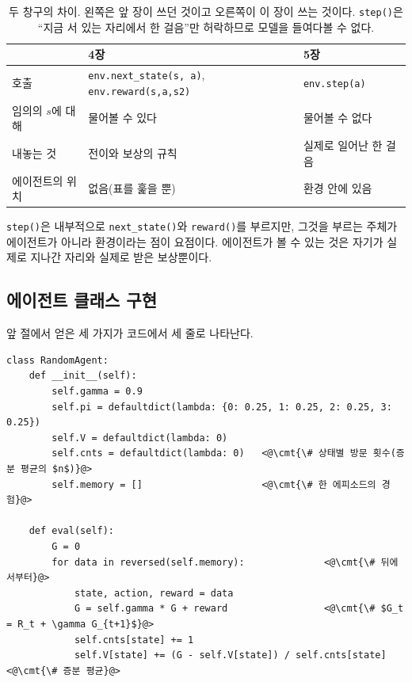 \documentclass[11pt,a4paper]{article}
\newcommand{\cmt}[1]{\textcolor{codecm}{#1}}   %
\begin{document}
\begin{table}[htbp]
\centering
\caption{두 창구의 차이. 왼쪽은 앞 장이 쓰던 것이고 오른쪽이 이 장이 쓰는 것이다.
\lstinline|step()|은 ``지금 서 있는 자리에서 한 걸음''만 허락하므로 모델을 들여다볼 수 없다.}
\label{tab:step-vs}
\small
\begin{tabular}{@{}lll@{}}
\toprule
 & 4장 & 5장 \\
\midrule
호출              & \lstinline|env.next_state(s, a)|, \lstinline|env.reward(s,a,s2)| & \lstinline|env.step(a)| \\
임의의 $s$에 대해 & 물어볼 수 있다 & 물어볼 수 없다 \\
내놓는 것         & 전이와 보상의 규칙 & 실제로 일어난 한 걸음 \\
에이전트의 위치   & 없음(표를 훑을 뿐) & 환경 안에 있음 \\
\bottomrule
\end{tabular}
\end{table}

\lstinline|step()|은 내부적으로 \lstinline|next_state()|와 \lstinline|reward()|를 부르지만, 그것을
부르는 주체가 에이전트가 아니라 환경이라는 점이 요점이다. 에이전트가 볼 수 있는 것은 자기가 실제로
지나간 자리와 실제로 받은 보상뿐이다.

\subsection{에이전트 클래스 구현}
\label{sec:agent}

앞 절에서 얻은 세 가지가 코드에서 세 줄로 나타난다.

\begin{lstlisting}[caption={무작위 정책의 MC 평가 (\texttt{s02\_mc\_eval.py})},label={lst:mc-eval}]
class RandomAgent:
    def __init__(self):
        self.gamma = 0.9
        self.pi = defaultdict(lambda: {0: 0.25, 1: 0.25, 2: 0.25, 3: 0.25})
        self.V = defaultdict(lambda: 0)
        self.cnts = defaultdict(lambda: 0)   <@\cmt{\# 상태별 방문 횟수(증분 평균의 $n$)}@>
        self.memory = []                     <@\cmt{\# 한 에피소드의 경험}@>

    def eval(self):
        G = 0
        for data in reversed(self.memory):              <@\cmt{\# 뒤에서부터}@>
            state, action, reward = data
            G = self.gamma * G + reward                 <@\cmt{\# $G_t = R_t + \gamma G_{t+1}$}@>
            self.cnts[state] += 1
            self.V[state] += (G - self.V[state]) / self.cnts[state]   <@\cmt{\# 증분 평균}@>
\end{lstlisting}
\end{document}
